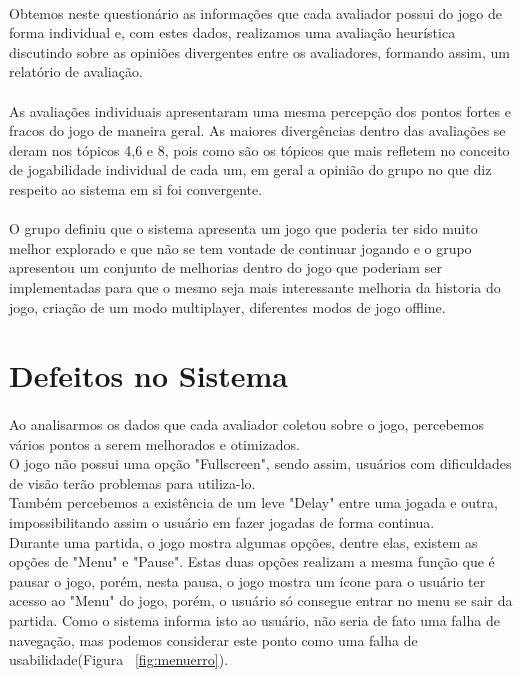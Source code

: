 \documentclass[12pt]{article}
\begin{document}
    \paragraph{}Obtemos neste questionário as informações que cada avaliador possui do jogo de forma individual e, com estes dados,  realizamos uma avaliação heurística discutindo sobre as opiniões divergentes entre os avaliadores, formando assim, um relatório de avaliação.
   \paragraph{}As avaliações individuais apresentaram uma mesma percepção dos pontos fortes e fracos do jogo de maneira geral. As maiores divergências dentro das avaliações se deram nos tópicos 4,6 e 8, pois como são os tópicos que mais refletem no conceito de jogabilidade individual de cada um, em geral a opinião do grupo no que diz respeito ao sistema em si foi convergente.
   \paragraph{}O grupo definiu que o sistema apresenta um jogo que poderia ter sido muito melhor explorado e que não se tem vontade de continuar jogando e o grupo apresentou um conjunto de melhorias dentro do jogo que poderiam ser implementadas para que o mesmo seja mais interessante melhoria da historia do jogo, criação de um modo multiplayer, diferentes modos de jogo offline.


\section{Defeitos no Sistema}

\paragraph{} Ao analisarmos os dados que cada avaliador coletou sobre o jogo, percebemos vários pontos a serem melhorados e otimizados.\\
O jogo não possui uma opção "Fullscreen", sendo assim, usuários com dificuldades de visão terão problemas para utiliza-lo. \\
Também percebemos a existência de um leve "Delay" entre uma jogada e outra, impossibilitando assim o usuário em fazer jogadas de forma continua. \\
Durante uma partida, o jogo mostra algumas opções, dentre elas, existem as opções de "Menu" e "Pause". Estas duas opções realizam a mesma função que é pausar o jogo, porém, nesta pausa, o jogo mostra um ícone para o usuário ter acesso ao "Menu" do jogo, porém, o usuário só consegue entrar no menu se sair da partida. Como o sistema informa isto ao usuário, não seria de fato uma falha de navegação, mas podemos considerar este ponto como uma falha de usabilidade(Figura ~\ref{fig:menuerro}).
\end{document}
